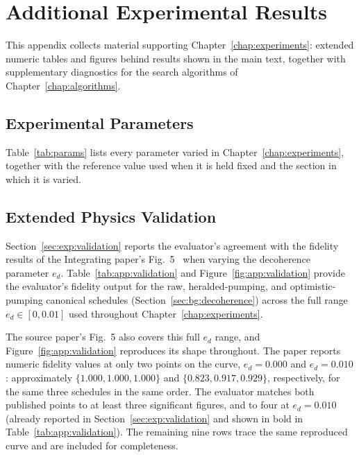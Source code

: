 \chapter{Additional Experimental Results}
\label{app:results}

This appendix collects material supporting Chapter~\ref{chap:experiments}: extended numeric tables and figures behind results shown in the main text, together with supplementary diagnostics for the search algorithms of Chapter~\ref{chap:algorithms}.

\section{Experimental Parameters}
\label{app:params}

Table~\ref{tab:params} lists every parameter varied in Chapter~\ref{chap:experiments}, together with the reference value used when it is held fixed and the section in which it is varied.



\section{Extended Physics Validation}
\label{app:validation}

Section~\ref{sec:exp:validation} reports the evaluator's agreement with the fidelity results of the Integrating paper's Fig.~5~\cite{Benchasattabuse2025Integrating} when varying the decoherence parameter $e_d$. Table~\ref{tab:app:validation} and Figure~\ref{fig:app:validation} provide the evaluator's fidelity output for the raw, heralded-pumping, and optimistic-pumping canonical schedules (Section~\ref{sec:bg:decoherence}) across the full range $e_d \in [0, 0.01]$ used throughout Chapter~\ref{chap:experiments}.

The source paper's Fig.~5 also covers this full $e_d$ range, and Figure~\ref{fig:app:validation} reproduces its shape throughout. The paper reports numeric fidelity values at only two points on the curve, $e_d=0.000$ and $e_d=0.010$: approximately $\{1.000, 1.000, 1.000\}$ and $\{0.823, 0.917, 0.929\}$, respectively, for the same three schedules in the same order. The evaluator matches both published points to at least three significant figures, and to four at $e_d=0.010$ (already reported in Section~\ref{sec:exp:validation} and shown in bold in Table~\ref{tab:app:validation}). The remaining nine rows trace the same reproduced curve and are included for completeness.

